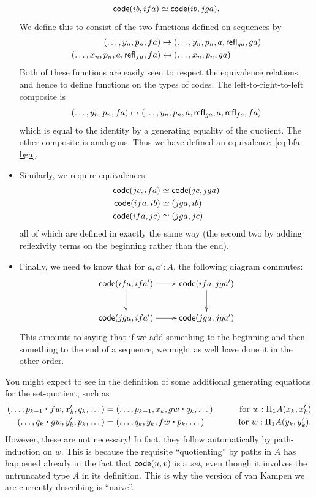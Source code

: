 \begin{itemize}
  \begin{equation}
    \code(ib, ifa) \simeq \code(ib,jga).\label{eq:bfa-bga}
  \end{equation}
  We define this to consist of the two functions defined on sequences by
  \begin{align*}
    (\dots, y_n, p_n,fa) &\mapsto (\dots,y_n,p_n,a,\mathsf{refl}_{ga},ga)\\
    (\dots, x_n, p_n, a, \mathsf{refl}_{fa}, fa) &\mapsfrom (\dots, x_n, p_n, ga)
  \end{align*}
  Both of these functions are easily seen to respect the equivalence relations, and hence to define functions on the types of codes.
  The left-to-right-to-left composite is
  \[ (\dots, y_n, p_n,fa) \mapsto
  (\dots,y_n,p_n,a,\mathsf{refl}_{ga},a,\mathsf{refl}_{fa},fa)
  \]
  which is equal to the identity by a generating equality of the quotient.
  The other composite is analogous.
  Thus we have defined an equivalence~\eqref{eq:bfa-bga}.
\item Similarly, we require equivalences
  \begin{align*}
    \mathsf{code}(jc,ifa) &\simeq \mathsf{code}(jc,jga)\\
    \mathsf{code}(ifa,ib)&\simeq (jga,ib)\\
    \mathsf{code}(ifa,jc)&\simeq (jga,jc)
  \end{align*}
  all of which are defined in exactly the same way (the second two by adding reflexivity terms on the beginning rather than the end).
\item Finally, we need to know that for $a,a':A$, the following diagram commutes:
  \begin{equation}\label{eq:bfa-bga-comm}
  \vcenter{\xymatrix{
      \code(ifa,ifa') \ar[r]\ar[d] &
      \code(ifa,jga')\ar[d]\\
      \code(jga,ifa')\ar[r] &
      \code(jga,jga')
      }}
  \end{equation}
  This amounts to saying that if we add something to the beginning and then something to the end of a sequence, we might as well have done it in the other order.
\end{itemize}

\begin{rmk}\label{rmk:naive}
  You might expect to see in the definition of \code some additional generating equations for the set-quotient, such as
  \begin{alignat*}{2}
    (\dots, p_{k-1} \ct fw, x_{k}', q_{k}, \dots) &=
    (\dots, p_{k-1}, x_{k}, gw \ct q_{k}, \dots)
    & \qquad\text{for } w:\Pi_1A(x_{k},x_{k}')\\
    (\dots, q_k \ct gw, y_k', p_k, \dots) &=
    (\dots, q_k, y_k, fw \ct p_k, \dots)
    & \qquad\text{for } w:\Pi_1A(y_k, y_k').
  \end{alignat*}
  However, these are not necessary!
  In fact, they follow automatically by path-induction on $w$.
  This is because the requisite ``quotienting'' by paths in $A$ has happened already in the fact that $\mathsf{code}(u,v)$ is a \emph{set}, even though it involves the untruncated type $A$ in its definition.
  This is why the version of van Kampen we are currently describing is ``naive''.
\end{rmk}

